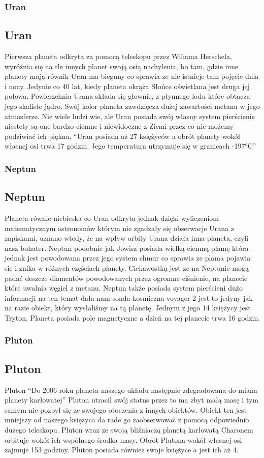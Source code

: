 \begin{frame}
\frametitle{Uran}
\subsection{Uran}
Pierwsza planeta odkryta za pomocą teleskopu przez Wiliama Herschela, wyróżnia się na tle innych planet swoją osią nachylenia, bo tam, gdzie inne planety mają równik Uran ma bieguny co sprawia ze nie istnieje tam pojęcie dnia i nocy. Jedynie co 40 lat, kiedy planeta okrąża Słońce oświetlana jest druga jej połowa. Powierzchnia Urana składa się głownie, z płynnego lodu które obtacza jego skaliste jądro. Swój kolor planeta zawdzięcza dużej zawartości metanu w jego atmosferze. Nie wiele ludzi wie, ale Uran posiada swój własny system pierścienie niestety są one bardzo ciemne i niewidoczne z Ziemi przez co nie możemy podziwiać ich piękna. “Uran posiada aż 27 księżyców a obrót planety wokół własnej osi trwa 17 godzin. Jego temperatura utrzymuje się w granicach -197°C”
\end{frame}


\begin{frame}
\frametitle{Neptun}
\subsection{Neptun}
Planeta równie niebieska co Uran odkryta jednak dzięki wyliczeniom matematycznym astronomów którym nie zgadzały się obserwacje Urana z zapiskami, uznano wtedy, że na wpływ orbity Urana działa inna planeta, czyli nasz bohater. Neptun podobnie jak Jowisz posiada wielką ciemną plamę  która jednak jest powodowana przez jego system chmur co sprawia ze plama pojawia się i znika w różnych częściach planety. Ciekawostką jest ze na Neptunie mogą padać deszcze diamentów  powodowanych przez ogromne ciśnienie, na planecie które uwalnia węgiel z metanu. Neptun także posiada system pierścieni dużo informacji na ten temat dała nam sonda kosmiczna voyager 2 jest to jedyny jak na razie obiekt, który wysłaliśmy na tą planetę. Jednym z jego 14 księżycy jest Tryton. Planeta posiada pole magnetyczne a dzień na tej planecie trwa 16 godzin.
\end{frame}


\begin{frame}
\frametitle{Pluton}
\subsection{Pluton}
Pluton “Do 2006 roku planeta naszego układu następnie zdegradowana do miana planety karłowatej” Pluton utracił swój status przez to ma zbyt małą masę i tym samym nie pozbył się ze swojego otoczenia z innych obiektów. Obiekt ten jest mniejszy od naszego księżyca da rade go zaobserwować z pomocą odpowiednio dużego teleskopu. Pluton wraz ze swoją bliźniaczą planetą karłowatą Charonem orbituje wokół ich wspólnego środka masy. Obrót Plutona wokół własnej osi zajmuje 153 godziny. Pluton posiada również swoje księżyce a jest ich aż 4.
\end{frame}


